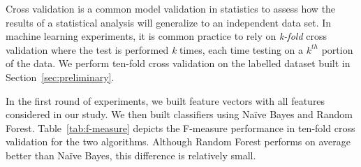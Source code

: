 Cross validation is a common model validation in statistics to
assess how the results of a statistical analysis will generalize to an
independent data set. In machine learning experiments, it is common practice to
rely on {\em k-fold} cross validation where the test is performed {\em k} times,
each time testing on a $k^{th}$ portion of the data. We perform ten-fold cross
validation on the labelled dataset built in Section~\ref{sec:preliminary}.

In the first round of experiments, we built feature vectors with all
features considered in our study. We then built classifiers using Na\"{i}ve
Bayes and Random Forest. Table~\ref{tab:f-measure} depicts the F-measure
performance in ten-fold cross validation for the two algorithms. Although
Random Forest performs on average better than Na\"{i}ve Bayes, this difference
is relatively small.







